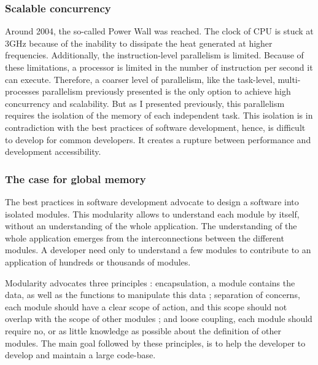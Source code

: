 \subsubsection{Scalable concurrency}

Around 2004, the so-called Power Wall was reached.
The clock of CPU is stuck at 3GHz because of the inability to dissipate the heat generated at higher frequencies.
Additionally, the instruction-level parallelism is limited.
Because of these limitations, a processor is limited in the number of instruction per second it can execute.
Therefore, a coarser level of parallelism, like the task-level, multi-processes parallelism previously presented is the only option to achieve high concurrency and scalability.
But as I presented previously, this parallelism requires the isolation of the memory of each independent task.
This isolation is in contradiction with the best practices of software development, hence, is difficult to develop for common developers.
It creates a rupture between performance and development accessibility.

\subsubsection{The case for global memory}

The best practices in software development advocate to design a software into isolated modules.
This modularity allows to understand each module by itself, without an understanding of the whole application.
The understanding of the whole application emerges from the interconnections between the different modules.
A developer need only to understand a few modules to contribute to an application of hundreds or thousands of modules.

Modularity advocates three principles : encapsulation, a module contains the data, as well as the functions to manipulate this data ; separation of concerns, each module should have a clear scope of action, and this scope should not overlap with the scope of other modules ; and loose coupling, each module should require no, or as little knowledge as possible about the definition of other modules.
The main goal followed by these principles, is to help the developer to develop and maintain a large code-base.

